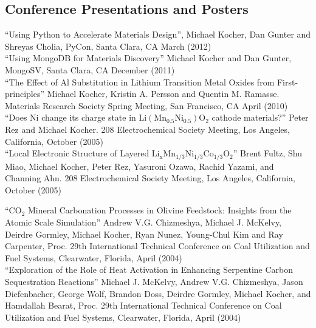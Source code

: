 \documentclass[margin,line]{resume}
\begin{document}
\begin{resume}
		\section{\mysidestyle Conference Presentations and
                  Posters}
                ``Using Python to Accelerate Materials Design'',
                Michael Kocher, Dan Gunter and Shreyas Cholia, PyCon,
                Santa Clara, CA March (2012)\vspace{2mm}\\
		``Using MongoDB for Materials Discovery'' Michael
                Kocher and Dan Gunter, MongoSV, Santa Clara, CA December (2011)\vspace{2mm}\\
                ``The Effect of Al Substitution in Lithium Transition Metal Oxides from First-principles'' Michael Kocher, Kristin A. Persson and Quentin M. Ramasse. Materials Research Society Spring Meeting, San Francisco, CA April (2010)\vspace{2mm}\\
		``Does Ni change its charge state in $\mathrm{Li(Mn_{0.5}Ni_{0.5})O_2}$ cathode materials?'' Peter Rez and Michael Kocher. 208 Electrochemical Society Meeting, Los Angeles, California, October (2005) \vspace{2mm}\\
		``Local Electronic Structure of Layered $\mathrm{Li_{x}Mn_{1/3}Ni_{1/3}Co_{1/3}O_{2}}$'' Brent Fultz, Shu Miao, Michael Kocher, Peter Rez, Yasuroni Ozawa, Rachid Yazami, and Channing Ahn. 208 Electrochemical Society Meeting, Los Angeles, California, October (2005) \vspace{2mm}\\

    \newpage

		``$\mathrm{CO_2}$ Mineral Carbonation Processes in
                  Olivine Feedstock: Insights from the Atomic Scale
                  Simulation'' Andrew V.G. Chizmeshya, Michael J.
                McKelvy, Deirdre Gormley, Michael Kocher, Ryan Nunez,
                Young-Chul Kim and Ray Carpenter, Proc. 29th
                International Technical Conference on Coal Utilization
                and Fuel Systems, Clearwater, Florida, April (2004)
                \vspace{2mm}\\
		``Exploration of the Role of Heat Activation in Enhancing Serpentine Carbon Sequestration Reactions'' Michael J. McKelvy, Andrew V.G. Chizmeshya, Jason Diefenbacher, George Wolf, Brandon Doss, Deirdre Gormley, Michael Kocher, and Hamdallah Bearat, Proc. 29th International Technical Conference on Coal Utilization and Fuel Systems, Clearwater, Florida, April (2004)\vspace{2mm}\\

\end{resume}
\end{document}
